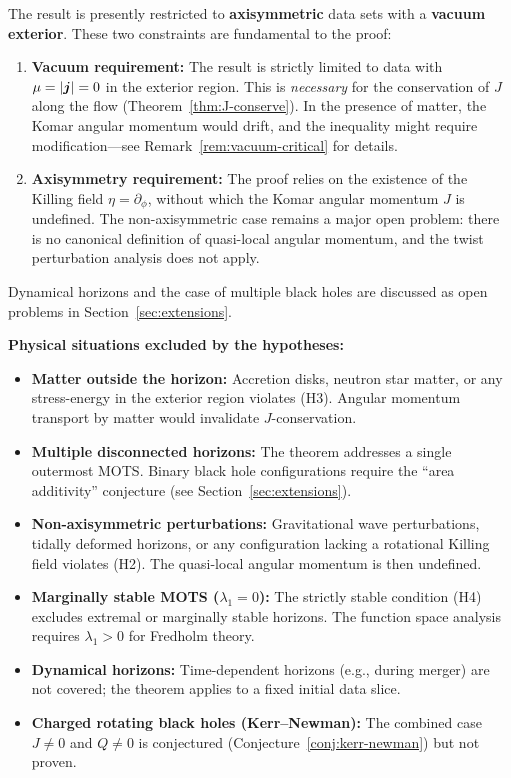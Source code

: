 \begin{remark}\label{rem:scope}
The result is presently restricted to \textbf{axisymmetric} data sets with a \textbf{vacuum exterior}. These two constraints are fundamental to the proof:
\begin{enumerate}
    \item \textbf{Vacuum requirement:} The result is strictly limited to data with $\mu = |\boldsymbol{j}| = 0$ in the exterior region. This is \emph{necessary} for the conservation of $J$ along the flow (Theorem~\ref{thm:J-conserve}). In the presence of matter, the Komar angular momentum would drift, and the inequality might require modification---see Remark~\ref{rem:vacuum-critical} for details.
    \item \textbf{Axisymmetry requirement:} The proof relies on the existence of the Killing field $\eta = \partial_\phi$, without which the Komar angular momentum $J$ is undefined. The non-axisymmetric case remains a major open problem: there is no canonical definition of quasi-local angular momentum, and the twist perturbation analysis does not apply.
\end{enumerate}
Dynamical horizons and the case of multiple black holes are discussed as open problems in Section~\ref{sec:extensions}.

\textbf{Physical situations excluded by the hypotheses:}
\begin{itemize}[leftmargin=1.5em, itemsep=1pt]
    \item \textbf{Matter outside the horizon:} Accretion disks, neutron star matter, or any stress-energy in the exterior region violates (H3). Angular momentum transport by matter would invalidate $J$-conservation.
    \item \textbf{Multiple disconnected horizons:} The theorem addresses a single outermost MOTS. Binary black hole configurations require the ``area additivity'' conjecture (see Section~\ref{sec:extensions}).
    \item \textbf{Non-axisymmetric perturbations:} Gravitational wave perturbations, tidally deformed horizons, or any configuration lacking a rotational Killing field violates (H2). The quasi-local angular momentum is then undefined.
    \item \textbf{Marginally stable MOTS ($\lambda_1 = 0$):} The strictly stable condition (H4) excludes extremal or marginally stable horizons. The function space analysis requires $\lambda_1 > 0$ for Fredholm theory.
    \item \textbf{Dynamical horizons:} Time-dependent horizons (e.g., during merger) are not covered; the theorem applies to a fixed initial data slice.
    \item \textbf{Charged rotating black holes (Kerr--Newman):} The combined case $J \neq 0$ and $Q \neq 0$ is conjectured (Conjecture~\ref{conj:kerr-newman}) but not proven.
\end{itemize}
\end{remark}

